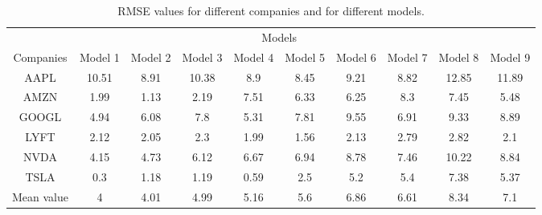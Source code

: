\begin{table}
    \centering
    \caption{RMSE values for different companies and for different models.}
    \label{id:tab:wyniki}
    \begin{tabular*}{\linewidth}{@{\extracolsep{\fill}} cccccccccc }%
    \toprule
                 &                                     \multicolumn{8}{c}{Models}                                      \\
                 \cmidrule{2-10}
                 \cmidrule(r){4-6}\cmidrule(r){7-10}
        Companies &     Model 1 &   Model 2 & Model 3 & Model 4 & Model 5 & Model 6 & Model 7 & Model 8 & Model 9 \\
    \midrule
              AAPL  & 10.51& 8.91 & 10.38 & 8.9    & 8.45  & 9.21 & 8.82  & 12.85 & 11.89 \\
              AMZN  & 1.99 & 1.13 & 2.19  & 7.51   & 6.33  & 6.25 & 8.3   & 7.45  & 5.48 \\
              GOOGL & 4.94 & 6.08 & 7.8   & 5.31   & 7.81  & 9.55 & 6.91  & 9.33  & 8.89 \\
              LYFT  & 2.12 & 2.05 & 2.3   & 1.99   & 1.56  & 2.13 & 2.79  & 2.82  & 2.1 \\
              NVDA  & 4.15 & 4.73 & 6.12  & 6.67   & 6.94  & 8.78 & 7.46  & 10.22 & 8.84 \\
              TSLA  & 0.3  & 1.18 & 1.19  & 0.59   & 2.5   & 5.2  & 5.4   & 7.38  & 5.37 \\
              Mean value  & 4 & 4.01 & 4.99 & 5.16 & 5.6   & 6.86 & 6.61  & 8.34  & 7.1 \\
    \bottomrule
    \end{tabular*}
    \end{table}  
    